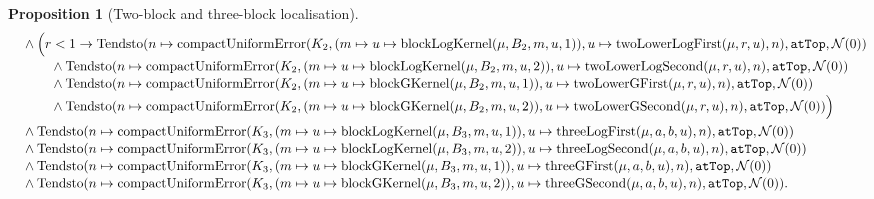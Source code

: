 \documentclass[9pt]{extarticle}
\newtheorem{proposition}[lemma]{Proposition}
\theoremstyle{definition}
\theoremstyle{remark}
\begin{document}
\begin{proposition}[Two-block and three-block localisation]
\begin{align*}
&\quad\wedge\Bigl(r<1\to
 \operatorname{Tendsto}
  (n\mapsto\operatorname{compactUniformError}
   (K_2,(m\mapsto u\mapsto\operatorname{blockLogKernel}(\mu,B_2,m,u,1)),
    u\mapsto\operatorname{twoLowerLogFirst}(\mu,r,u),n),
   \texttt{atTop},\mathcal N(0))\\[-2pt]
&\hspace{11mm}\wedge
 \operatorname{Tendsto}
  (n\mapsto\operatorname{compactUniformError}
   (K_2,(m\mapsto u\mapsto\operatorname{blockLogKernel}(\mu,B_2,m,u,2)),
    u\mapsto\operatorname{twoLowerLogSecond}(\mu,r,u),n),
   \texttt{atTop},\mathcal N(0))\\[-2pt]
&\hspace{11mm}\wedge
 \operatorname{Tendsto}
  (n\mapsto\operatorname{compactUniformError}
   (K_2,(m\mapsto u\mapsto\operatorname{blockGKernel}(\mu,B_2,m,u,1)),
    u\mapsto\operatorname{twoLowerGFirst}(\mu,r,u),n),
   \texttt{atTop},\mathcal N(0))\\[-2pt]
&\hspace{11mm}\wedge
 \operatorname{Tendsto}
  (n\mapsto\operatorname{compactUniformError}
   (K_2,(m\mapsto u\mapsto\operatorname{blockGKernel}(\mu,B_2,m,u,2)),
    u\mapsto\operatorname{twoLowerGSecond}(\mu,r,u),n),
   \texttt{atTop},\mathcal N(0))\Bigr)\\
&\quad\wedge
 \operatorname{Tendsto}
  (n\mapsto\operatorname{compactUniformError}
   (K_3,(m\mapsto u\mapsto\operatorname{blockLogKernel}(\mu,B_3,m,u,1)),
    u\mapsto\operatorname{threeLogFirst}(\mu,a,b,u),n),
   \texttt{atTop},\mathcal N(0))\\[-2pt]
&\quad\wedge
 \operatorname{Tendsto}
  (n\mapsto\operatorname{compactUniformError}
   (K_3,(m\mapsto u\mapsto\operatorname{blockLogKernel}(\mu,B_3,m,u,2)),
    u\mapsto\operatorname{threeLogSecond}(\mu,a,b,u),n),
   \texttt{atTop},\mathcal N(0))\\[-2pt]
&\quad\wedge
 \operatorname{Tendsto}
  (n\mapsto\operatorname{compactUniformError}
   (K_3,(m\mapsto u\mapsto\operatorname{blockGKernel}(\mu,B_3,m,u,1)),
    u\mapsto\operatorname{threeGFirst}(\mu,a,b,u),n),
   \texttt{atTop},\mathcal N(0))\\[-2pt]
&\quad\wedge
 \operatorname{Tendsto}
  (n\mapsto\operatorname{compactUniformError}
   (K_3,(m\mapsto u\mapsto\operatorname{blockGKernel}(\mu,B_3,m,u,2)),
    u\mapsto\operatorname{threeGSecond}(\mu,a,b,u),n),
   \texttt{atTop},\mathcal N(0)).
\end{align*}
\end{proposition}
\end{document}
